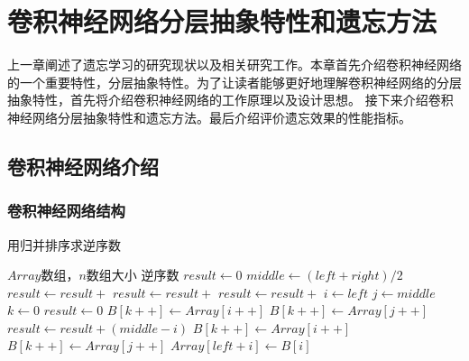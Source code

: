 
\chapter{卷积神经网络分层抽象特性和遗忘方法}
上一章阐述了遗忘学习的研究现状以及相关研究工作。本章首先介绍卷积神经网络的一个重要特性，分层抽象特性。为了让读者能够更好地理解卷积神经网络的分层抽象特性，首先将介绍卷积神经网络的工作原理以及设计思想。
接下来介绍卷积神经网络分层抽象特性和遗忘方法。最后介绍评价遗忘效果的性能指标。

\section{卷积神经网络介绍}

\subsection{卷积神经网络结构}

\begin{algorithm}  
    \caption{用归并排序求逆序数}  
    \begin{algorithmic}[1] %
        \Require $Array$数组，$n$数组大小  
        \Ensure 逆序数  
            \State $result \gets 0$  
                \State $middle \gets (left + right) / 2$  
                \State $result \gets result +$   
                \State $result \gets result +$   
                \State $result \gets result +$   
            \EndIf  
            \State {}  
        \EndFunction  
        \State  
            \State $i\gets left$  
            \State $j\gets middle$  
            \State $k\gets 0$  
            \State $result \gets 0$  
                    \State $B[k++]\gets Array[i++]$  
                \Else  
                    \State $B[k++] \gets Array[j++]$  
                    \State $result \gets result + (middle - i)$  
                \EndIf  
            \EndWhile  
                \State $B[k++] \gets Array[i++]$  
            \EndWhile  
                \State $B[k++] \gets Array[j++]$  
            \EndWhile  
                \State $Array[left + i] \gets B[i]$  
            \EndFor  
            \State {}  
        \EndFunction  
    \end{algorithmic}  
\end{algorithm}  


